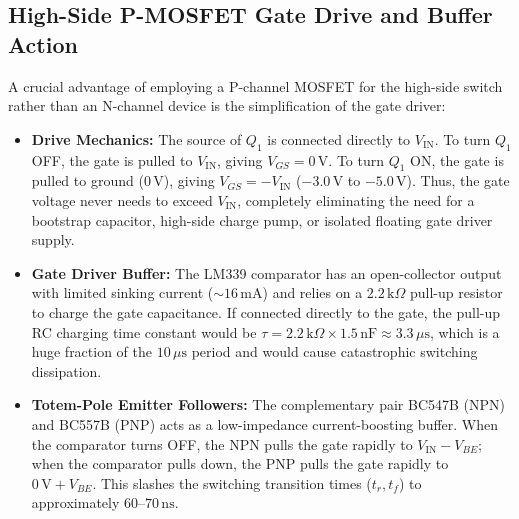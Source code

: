 \documentclass[12pt,a4paper]{article}
\newcommand{\Vin}{V_{\mathrm{IN}}}
\begin{document}
\subsection{High-Side P-MOSFET Gate Drive and Buffer Action}
A crucial advantage of employing a P-channel MOSFET for the high-side switch rather than an N-channel device is the simplification of the gate driver:
\begin{itemize}[leftmargin=1.5em]
    \item \textbf{Drive Mechanics:} The source of $Q_1$ is connected directly to $\Vin$. To turn $Q_1$ OFF, the gate is pulled to $\Vin$, giving $V_{GS} = 0\,\mathrm{V}$. To turn $Q_1$ ON, the gate is pulled to ground ($0\,\mathrm{V}$), giving $V_{GS} = -\Vin$ ($-3.0\,\mathrm{V}$ to $-5.0\,\mathrm{V}$). Thus, the gate voltage never needs to exceed $\Vin$, completely eliminating the need for a bootstrap capacitor, high-side charge pump, or isolated floating gate driver supply.
    \item \textbf{Gate Driver Buffer:} The LM339 comparator has an open-collector output with limited sinking current ($\sim 16\,\mathrm{mA}$) and relies on a $2.2\,\mathrm{k}\Omega$ pull-up resistor to charge the gate capacitance. If connected directly to the gate, the pull-up RC charging time constant would be $\tau = 2.2\,\mathrm{k}\Omega \times 1.5\,\mathrm{nF} \approx 3.3\,\mu\mathrm{s}$, which is a huge fraction of the $10\,\mu\mathrm{s}$ period and would cause catastrophic switching dissipation.
    \item \textbf{Totem-Pole Emitter Followers:} The complementary pair BC547B (NPN) and BC557B (PNP) acts as a low-impedance current-boosting buffer. When the comparator turns OFF, the NPN pulls the gate rapidly to $\Vin - V_{BE}$; when the comparator pulls down, the PNP pulls the gate rapidly to $0\,\mathrm{V} + V_{BE}$. This slashes the switching transition times ($t_r, t_f$) to approximately $60\text{--}70\,\mathrm{ns}$.
\end{itemize}
\end{document}
